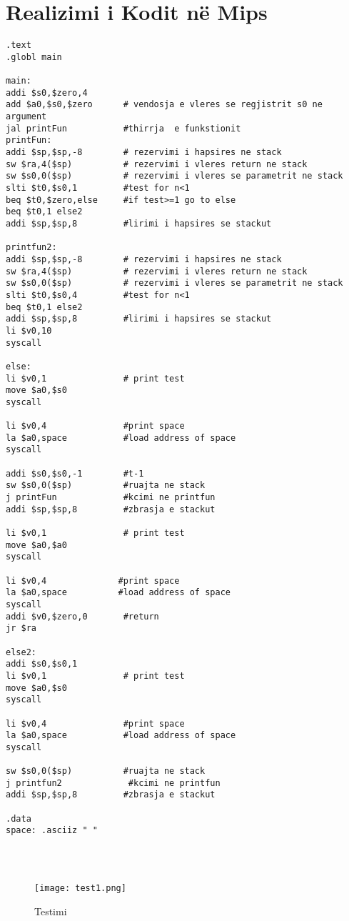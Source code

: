 \documentclass[11pt]{article}
\begin{document}
\section{Realizimi i Kodit në Mips}
\begin{verbatim}
.text
.globl main

main:
addi $s0,$zero,4
add $a0,$s0,$zero      # vendosja e vleres se regjistrit s0 ne argument
jal printFun           #thirrja  e funkstionit
printFun:
addi $sp,$sp,-8        # rezervimi i hapsires ne stack 
sw $ra,4($sp)          # rezervimi i vleres return ne stack
sw $s0,0($sp)          # rezervimi i vleres se parametrit ne stack
slti $t0,$s0,1         #test for n<1
beq $t0,$zero,else     #if test>=1 go to else 
beq $t0,1 else2
addi $sp,$sp,8         #lirimi i hapsires se stackut 

printfun2:
addi $sp,$sp,-8        # rezervimi i hapsires ne stack 
sw $ra,4($sp)          # rezervimi i vleres return ne stack
sw $s0,0($sp)          # rezervimi i vleres se parametrit ne stack
slti $t0,$s0,4         #test for n<1
beq $t0,1 else2
addi $sp,$sp,8         #lirimi i hapsires se stackut 
li $v0,10
syscall

else:
li $v0,1               # print test 
move $a0,$s0
syscall

li $v0,4               #print space
la $a0,space           #load address of space
syscall

addi $s0,$s0,-1        #t-1
sw $s0,0($sp)          #ruajta ne stack 
j printFun             #kcimi ne printfun
addi $sp,$sp,8         #zbrasja e stackut

li $v0,1               # print test 
move $a0,$a0
syscall

li $v0,4              #print space
la $a0,space          #load address of space
syscall
addi $v0,$zero,0       #return 
jr $ra

else2:
addi $s0,$s0,1
li $v0,1               # print test 
move $a0,$s0
syscall

li $v0,4               #print space
la $a0,space           #load address of space
syscall

sw $s0,0($sp)          #ruajta ne stack 
j printfun2             #kcimi ne printfun
addi $sp,$sp,8         #zbrasja e stackut

.data
space: .asciiz " "


      
\end{verbatim}


\begin{figure}[h]
    \centering
    \texttt{[image: test1.png]}
    \caption{Testimi}
    \label{testimi}
\end{figure}
\end{document}
